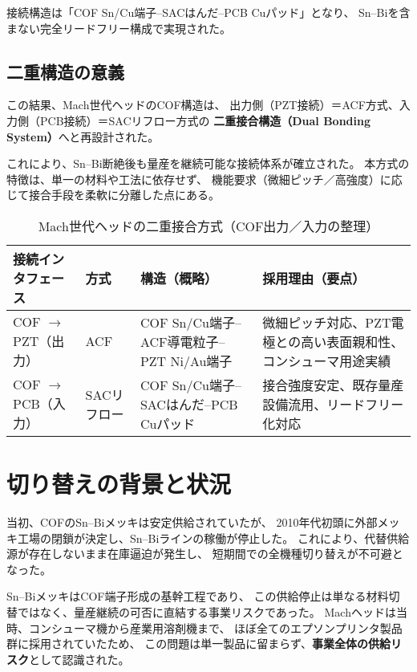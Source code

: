 \documentclass[conference]{IEEEtran}
\begin{document}
接続構造は「COF Sn/Cu端子–SACはんだ–PCB Cuパッド」となり、  
Sn–Biを含まない完全リードフリー構成で実現された。

\subsection{二重構造の意義}
この結果、Mach世代ヘッドのCOF構造は、  
出力側（PZT接続）＝ACF方式、入力側（PCB接続）＝SACリフロー方式の  
\textbf{二重接合構造（Dual Bonding System）}へと再設計された。  

これにより、Sn–Bi断絶後も量産を継続可能な接続体系が確立された。  
本方式の特徴は、単一の材料や工法に依存せず、  
機能要求（微細ピッチ／高強度）に応じて接合手段を柔軟に分離した点にある。  

\begin{table}[t]
\centering
\footnotesize
\caption{Mach世代ヘッドの二重接合方式（COF出力／入力の整理）}
\label{tab:dual-bond}
\renewcommand{\arraystretch}{1.1}
\begin{tabularx}{\columnwidth}{@{}p{2.1cm} p{1.2cm} Y Y@{}}
\toprule
接続インタフェース & 方式 & 構造（概略） & 採用理由（要点） \\
\midrule
COF $\rightarrow$ PZT（出力） & ACF &
COF Sn/Cu端子–ACF導電粒子–PZT Ni/Au端子 &
微細ピッチ対応、PZT電極との高い表面親和性、コンシューマ用途実績 \\
\addlinespace[2pt]
COF $\rightarrow$ PCB（入力） & SACリフロー &
COF Sn/Cu端子–SACはんだ–PCB Cuパッド &
接合強度安定、既存量産設備流用、リードフリー化対応 \\
\bottomrule
\end{tabularx}
\end{table}

\section{切り替えの背景と状況}

当初、COFのSn–Biメッキは安定供給されていたが、  
2010年代初頭に外部メッキ工場の閉鎖が決定し、Sn–Biラインの稼働が停止した。  
これにより、代替供給源が存在しないまま在庫逼迫が発生し、  
短期間での全機種切り替えが不可避となった。  

Sn–BiメッキはCOF端子形成の基幹工程であり、  
この供給停止は単なる材料切替ではなく、量産継続の可否に直結する事業リスクであった。  
Machヘッドは当時、コンシューマ機から産業用溶剤機まで、  
ほぼ全てのエプソンプリンタ製品群に採用されていたため、  
この問題は単一製品に留まらず、\textbf{事業全体の供給リスク}として認識された。  
\end{document}
